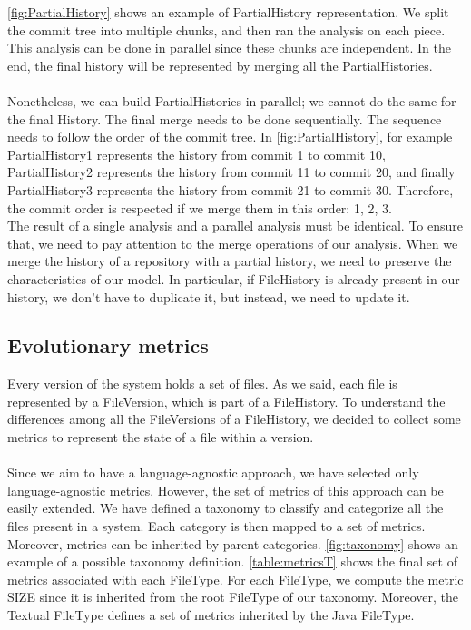 \autoref{fig:PartialHistory} shows an example of PartialHistory representation. 
We split the commit tree into multiple chunks, and then ran the analysis on each piece. 
This analysis can be done in parallel since these chunks are independent. 
In the end, the final history will be represented by merging all the PartialHistories. \\
\\
Nonetheless, we can build PartialHistories in parallel; we cannot do the same for the final History. 
The final merge needs to be done sequentially. The sequence needs to follow the order of the commit tree. 
In \autoref{fig:PartialHistory}, for example
PartialHistory1 represents the history from commit 1 to commit 10, 
PartialHistory2 represents the history from commit 11 to commit 20, and finally 
PartialHistory3 represents the history from commit 21 to commit 30.
Therefore, the commit order is respected if we merge them in this order: 1, 2, 3. 
\\
The result of a single analysis and a parallel analysis must be identical. 
To ensure that, we need to pay attention to the merge operations of our analysis.
When we merge the history of a repository with a partial history, we need to preserve the characteristics of our model. 
In particular, if FileHistory is already present in our history, we don't have to duplicate it, but instead, we need to update it. 

\label{s:evolutionaryMetrics}
\subsection*{Evolutionary metrics}
Every version of the system holds a set of files. 
As we said, each file is represented by a FileVersion, which is part of a FileHistory. 
To understand the differences among all the FileVersions of a FileHistory,
we decided to collect some metrics to represent the state of a file within a version.\\
\\
Since we aim to have a language-agnostic approach, we have selected only language-agnostic metrics. 
However, the set of metrics of this approach can be easily extended.
We have defined a taxonomy to classify and categorize all the files present in a system. 
Each category is then mapped to a set of metrics. Moreover, metrics can be inherited by parent categories. 
\autoref{fig:taxonomy} shows an example of a possible taxonomy definition. \autoref{table:metricsT} shows the final set of metrics associated with each FileType. For each FileType, we compute the metric SIZE since it is inherited from the root FileType of our taxonomy. Moreover, the Textual FileType defines a set of metrics inherited by the Java FileType. 
\\

